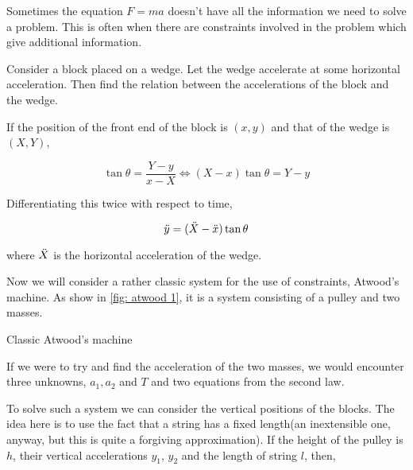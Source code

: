 Sometimes the equation \(F = ma\) doesn't have all the information we need to solve a 
problem. This is often when there are constraints involved in the problem which give 
additional information.

\begin{marginfigure}
\end{marginfigure}

\begin{example}
Consider a block placed on a wedge. Let the wedge accelerate 
at some horizontal acceleration. Then find the relation between the accelerations 
of the block and the wedge.

\begin{soln}
    If the position of the front end of the block is 
    \((x,y)\) and that of the wedge is \((X, Y)\), 

    \begin{equation*}
        \tan\theta = \frac{Y-y}{x - X} \iff (X - x)\tan\theta = Y - y
    \end{equation*}

    Differentiating this twice with respect to time, 

    \begin{equation}
        \ddot{y} = (\ddot{X} - \ddot{x}) \tan\theta
    \end{equation}

    where \(\ddot{X}\) is the horizontal acceleration of the wedge.
\end{soln}
\end{example}

Now we will consider a rather classic system for the use of constraints,
Atwood's machine. As show in \cref{fig: atwood 1}, it is a system consisting of a pulley 
and two masses. 

\begin{marginfigure}
    \caption{Classic Atwood's machine}
    \label{fig: atwood 1}
\end{marginfigure}

If we were to try and find the acceleration of the two masses, we would encounter 
three unknowns, \(a_1, a_2\) and \(T\) and two equations from the second law.

To solve such a system we can consider the vertical positions of the blocks. The idea 
here is to use the fact that a string has a fixed length(an inextensible one, anyway, but 
this is quite a forgiving approximation). If the height of the pulley is \(h\), 
their vertical accelerations \(y_1\), \(y_2\) and the length of string \(l\), then,

